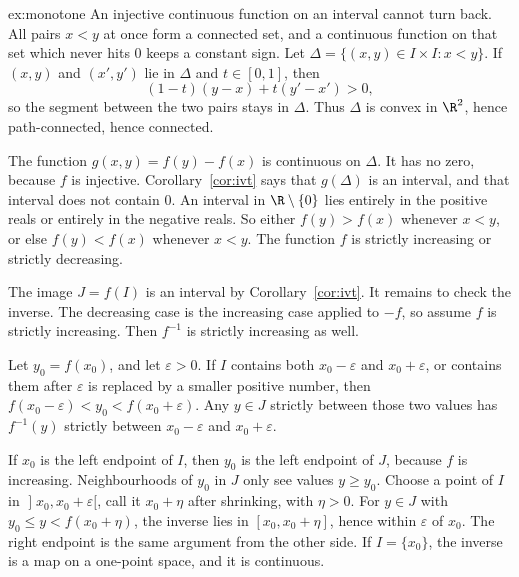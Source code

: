 \begin{solution}{ex:monotone}
\idea An injective continuous function on an interval cannot turn back. All pairs $x<y$ at once form a connected set, and a continuous function on that set which never hits $0$ keeps a constant sign.
\writeup Let $\Delta=\{(x,y)\in I\times I:x<y\}$. If $(x,y)$ and $(x',y')$ lie in $\Delta$ and $t\in[0,1]$, then
\[
(1-t)(y-x)+t(y'-x')>0,
\]
so the segment between the two pairs stays in $\Delta$. Thus $\Delta$ is convex in $\R^2$, hence path-connected, hence connected.

The function $g(x,y)=f(y)-f(x)$ is continuous on $\Delta$. It has no zero, because $f$ is injective. Corollary~\ref{cor:ivt} says that $g(\Delta)$ is an interval, and that interval does not contain $0$. An interval in $\R\setminus\{0\}$ lies entirely in the positive reals or entirely in the negative reals. So either $f(y)>f(x)$ whenever $x<y$, or else $f(y)<f(x)$ whenever $x<y$. The function $f$ is strictly increasing or strictly decreasing.

The image $J=f(I)$ is an interval by Corollary~\ref{cor:ivt}. It remains to check the inverse. The decreasing case is the increasing case applied to $-f$, so assume $f$ is strictly increasing. Then $f^{-1}$ is strictly increasing as well.

Let $y_0=f(x_0)$, and let $\varepsilon>0$. If $I$ contains both $x_0-\varepsilon$ and $x_0+\varepsilon$, or contains them after $\varepsilon$ is replaced by a smaller positive number, then $f(x_0-\varepsilon)<y_0<f(x_0+\varepsilon)$. Any $y\in J$ strictly between those two values has $f^{-1}(y)$ strictly between $x_0-\varepsilon$ and $x_0+\varepsilon$.

If $x_0$ is the left endpoint of $I$, then $y_0$ is the left endpoint of $J$, because $f$ is increasing. Neighbourhoods of $y_0$ in $J$ only see values $y\ge y_0$. Choose a point of $I$ in $\mathopen]x_0,x_0+\varepsilon[$, call it $x_0+\eta$ after shrinking, with $\eta>0$. For $y\in J$ with $y_0\le y<f(x_0+\eta)$, the inverse lies in $[x_0,x_0+\eta]$, hence within $\varepsilon$ of $x_0$. The right endpoint is the same argument from the other side. If $I=\{x_0\}$, the inverse is a map on a one-point space, and it is continuous.
\end{solution}

